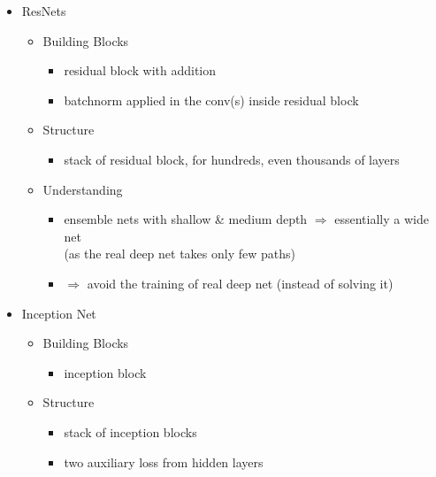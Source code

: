 \begin{itemize}
\item ResNets
	\begin{itemize}
	\item Building Blocks
		\begin{itemize}
		\item residual block with addition
		\item batchnorm applied in the conv(s) inside residual block
		\end{itemize}
	\item Structure
		\begin{itemize}
		\item stack of residual block, for hundreds, even thousands of layers
		\end{itemize}
	\item Understanding
		\begin{itemize}
		\item ensemble nets with shallow \& medium depth $\Rightarrow$ essentially a wide net \\
		(as the real deep net takes only few paths)
		\item $\Rightarrow$ avoid the training of real deep net (instead of solving it)
		\end{itemize}
	\end{itemize}
	
\item Inception Net
	\begin{itemize}
	\item Building Blocks
		\begin{itemize}
		\item inception block
		\end{itemize}
	\item Structure
		\begin{itemize}
		\item stack of inception blocks
		\item two auxiliary loss from hidden layers
		\end{itemize}
	\end{itemize}
\end{itemize}

